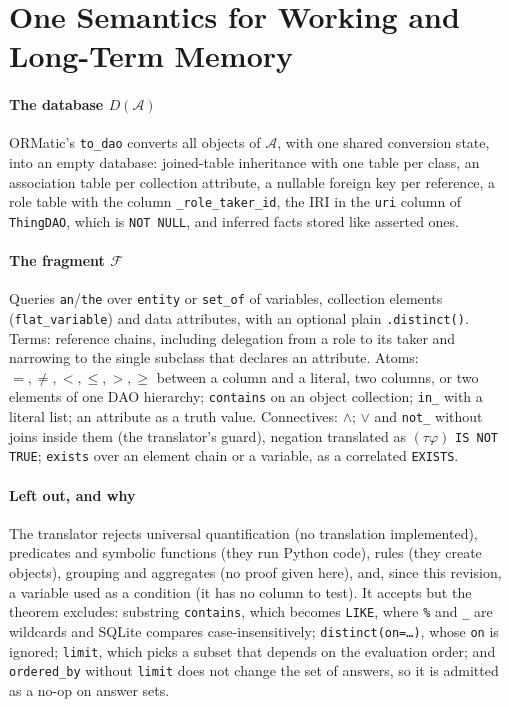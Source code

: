 \section{One Semantics for Working and Long-Term Memory}
\label{sec:ormatic-theorem}

\paragraph{The database $D(\mathcal{A})$} ORMatic's \texttt{to\_dao} converts all objects of
$\mathcal{A}$, with one shared conversion state, into an empty database: joined-table
inheritance with one table per class, an association table per collection attribute, a nullable
foreign key per reference, a role table with the column \texttt{\_role\_taker\_id}, the IRI in
the \texttt{uri} column of \texttt{ThingDAO}, which is \texttt{NOT NULL}, and inferred facts stored
like asserted ones.

\paragraph{The fragment $\mathcal{F}$} Queries \texttt{an}/\texttt{the} over \texttt{entity} or
\texttt{set\_of} of variables, collection elements (\texttt{flat\_variable}) and data attributes,
with an optional plain \texttt{.distinct()}. Terms: reference chains, including delegation from a
role to its taker and narrowing to the single subclass that declares an attribute. Atoms:
$=,\neq,<,\le,>,\ge$ between a column and a literal, two columns, or two elements of one DAO
hierarchy; \texttt{contains} on an object collection; \texttt{in\_} with a literal list; an
attribute as a truth value. Connectives: $\wedge$; $\vee$ and \texttt{not\_} without joins inside
them (the translator's guard), negation translated as $(\tau\varphi)$ \texttt{IS NOT TRUE};
\texttt{exists} over an element chain or a variable, as a correlated \texttt{EXISTS}.

\paragraph{Left out, and why} The translator rejects universal quantification (no
translation implemented), predicates and symbolic functions (they run Python code), rules (they
create objects), grouping and aggregates (no proof given here), and, since this revision, a
variable used as a condition (it has no column to test). It accepts but the theorem excludes:
substring \texttt{contains}, which becomes \texttt{LIKE}, where \texttt{\%} and \texttt{\_} are
wildcards and SQLite compares case-insensitively; \texttt{distinct(on=\dots)}, whose \texttt{on}
is ignored; \texttt{limit}, which picks a subset that depends on the evaluation order; and
\texttt{ordered\_by} without \texttt{limit} does not change the set of answers, so it is
admitted as a no-op on answer sets.

